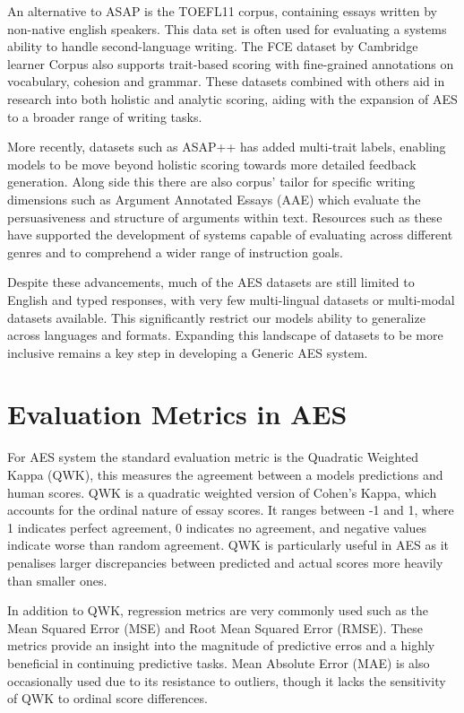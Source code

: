 \documentclass[8pt]{report}
\begin{document}
An alternative to ASAP is the TOEFL11 corpus, containing essays written by non-native english speakers. This data set is often used for evaluating a systems ability to handle second-language writing. The FCE dataset by Cambridge learner
Corpus also supports trait-based scoring with fine-grained annotations on vocabulary, cohesion and grammar. These datasets combined with others aid in research into both holistic and analytic scoring, aiding with the expansion of AES 
to a broader range of writing tasks.

More recently, datasets such as ASAP++ has added multi-trait labels, enabling models to be move beyond holistic scoring towards more detailed feedback generation. Along side this there are also corpus' tailor for specific writing
dimensions such as Argument Annotated Essays (AAE) which evaluate the persuasiveness and structure of arguments within text. Resources such as these have supported the development of systems capable of evaluating across different genres 
and to comprehend a wider range of instruction goals.

Despite these advancements, much of the AES datasets are still limited to English and typed responses, with very few multi-lingual datasets or multi-modal datasets available. This significantly restrict our models ability 
to generalize across languages and formats. Expanding this landscape of datasets to be more inclusive remains a key step in developing a Generic AES system.


\section{Evaluation Metrics in AES}
For AES system the standard evaluation metric is the Quadratic Weighted Kappa (QWK), this measures the agreement between a models predictions and human scores. QWK is a quadratic weighted version of Cohen's Kappa, 
which accounts for the ordinal nature of essay scores. It ranges between -1 and 1, where 1 indicates perfect agreement, 0 indicates no agreement, and negative values indicate worse than random agreement. QWK is particularly useful in AES as it 
penalises larger discrepancies between predicted and actual scores more heavily than smaller ones.

In addition to QWK, regression metrics are very commonly used such as the Mean Squared Error (MSE) and Root Mean Squared Error (RMSE).  These metrics provide an insight into the magnitude of predictive erros and a highly beneficial 
in continuing predictive tasks. Mean Absolute Error (MAE) is also occasionally used due to its resistance to outliers, though it lacks the sensitivity of QWK to ordinal score differences.
\end{document}
